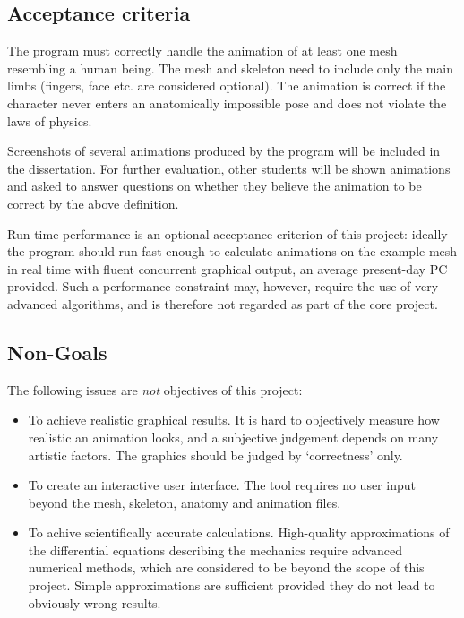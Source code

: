 \documentclass{article}
\begin{document}
\subsection*{Acceptance criteria}

The program must correctly handle the animation of at least one mesh
resembling a human being. The mesh and skeleton need to include only
the main limbs (fingers, face etc. are considered optional). The
animation is correct if the character never enters an anatomically
impossible pose and does not violate the laws of physics.

Screenshots of several animations produced by the program will be
included in the dissertation. For further evaluation, other students
will be shown animations and asked to answer questions on whether they
believe the animation to be correct by the above definition.

Run-time performance is an optional acceptance criterion of this
project: ideally the program should run fast enough to calculate
animations on the example mesh in real time with fluent concurrent
graphical output, an average present-day PC provided. Such a
performance constraint may, however, require the use of very advanced
algorithms, and is therefore not regarded as part of the core project.


\subsection*{Non-Goals}

The following issues are {\em not} objectives of this project:

\begin{itemize}
\item To achieve realistic graphical results. It is hard to objectively
  measure how realistic an animation looks, and a subjective judgement
  depends on many artistic factors. The graphics should be judged by
  `correctness' only.

\item To create an interactive user interface. The tool requires no user
  input beyond the mesh, skeleton, anatomy and animation files.

\item To achive scientifically accurate calculations. High-quality
  approximations of the differential equations describing the
  mechanics require advanced numerical methods, which are considered
  to be beyond the scope of this project. Simple approximations are
  sufficient provided they do not lead to obviously wrong results.
\end{itemize}
\end{document}
